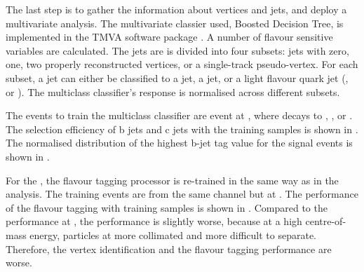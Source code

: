 The last step is to gather the information about vertices and jets, and deploy a multivariate analysis. The multivariate classier used, Boosted Decision Tree,  is implemented in the TMVA software package \cite{Hocker:2007ht}. A number of flavour sensitive variables are calculated. The jets are is divided into four subsets: jets with zero, one, two properly reconstructed vertices, or a single-track pseudo-vertex. For each subset, a jet can either be classified to a \Pbottom jet, a \Pcharm jet, or a light flavour quark jet (\Pup, \Pdown or \Pstrange). The multiclass classifier's response is normalised across different subsets.


The events to train the multiclass classifier are \HepProcess{\Pep \Pem \to \PZ \APnu \Pnu} event at , where \PZ decays to \HepProcess{\Pbottom\APbottom}, \HepProcess{\Pcharm\APcharm}, or \HepProcess{\Pup\APup/\Pdown\APdown/\Pstrange\APstrange}. The selection efficiency of b jets and c jets with the training samples is shown in . The normalised distribution of the highest b-jet tag value for the signal events is shown in .



For the , the flavour tagging processor is re-trained in the same way as in the  analysis. The training events are from the same channel but at . The performance of the flavour tagging  with training samples is shown in . Compared to the performance at , the performance is slightly worse, because at a high centre-of-mass energy, particles at more collimated and more difficult to separate. Therefore, the vertex identification and the flavour tagging performance are worse.


